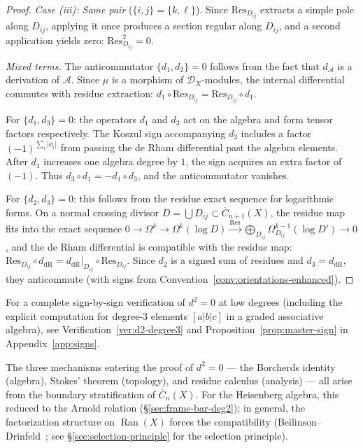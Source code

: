 \begin{proof}
\emph{Case (iii): Same pair} ($\{i,j\} = \{k,\ell\}$). Since $\text{Res}_{D_{ij}}$ extracts a simple pole along $D_{ij}$, applying it once produces a section regular along $D_{ij}$, and a second application yields zero: $\text{Res}_{D_{ij}}^2 = 0$.

\emph{Mixed terms.} The anticommutator $\{d_1, d_2\} = 0$ follows from the fact that $d_\mathcal{A}$ is a derivation of $\mathcal{A}$. Since $\mu$ is a morphism of $\mathcal{D}_X$-modules, the internal differential commutes with residue extraction: $d_1 \circ \text{Res}_{D_{ij}} = \text{Res}_{D_{ij}} \circ d_1$.

For $\{d_1, d_3\} = 0$: the operators $d_1$ and $d_3$ act on the algebra and form tensor factors respectively. The Koszul sign accompanying $d_3$ includes a factor $(-1)^{\sum_i |\phi_i|}$ from passing the de Rham differential past the algebra elements. After $d_1$ increases one algebra degree by $1$, the sign acquires an extra factor of $(-1)$. Thus $d_3 \circ d_1 = -d_1 \circ d_3$, and the anticommutator vanishes.

For $\{d_2, d_3\} = 0$: this follows from the residue exact sequence for logarithmic forms.  On a normal crossing divisor $D = \bigcup D_{ij} \subset \overline{C}_{n+1}(X)$, the residue map fits into the exact sequence $0 \to \Omega^k \to \Omega^k(\log D) \xrightarrow{\text{Res}} \bigoplus_{D_{ij}} \Omega^{k-1}_{D_{ij}}(\log D') \to 0$, and the de Rham differential is compatible with the residue map: $\text{Res}_{D_{ij}} \circ d_{\text{dR}} = d_{\text{dR}}|_{D_{ij}} \circ \text{Res}_{D_{ij}}$.  Since $d_2$ is a signed sum of residues and $d_3 = d_{\text{dR}}$, they anticommute (with signs from Convention~\ref{conv:orientations-enhanced}).
\end{proof}

\begin{remark}\label{rem:sign-bridge}
For a complete sign-by-sign verification of $d^2 = 0$ at low degrees
(including the explicit computation for degree-3 elements $[a|b|c]$ in a
graded associative algebra), see Verification~\ref{ver:d2-degree3} and
Proposition~\ref{prop:master-sign} in Appendix~\ref{app:signs}.
\end{remark}

\begin{remark}[Synthesis]\label{rem:d-squared-synthesis}\label{rem:geometric-miracle}
The three mechanisms entering the proof of $d^2 = 0$ ---
the Borcherds identity (algebra), Stokes' theorem (topology), and
residue calculus (analysis) --- all arise from the boundary
stratification of $\overline{C}_n(X)$.  For the Heisenberg algebra,
this reduced to the Arnold relation
(\S\ref{sec:frame-bar-deg2}); in general, the factorization structure
on $\operatorname{Ran}(X)$ forces the compatibility
(Beilinson--Drinfeld~\cite{BD04};
see \S\ref{sec:selection-principle} for the selection principle).
\end{remark}

